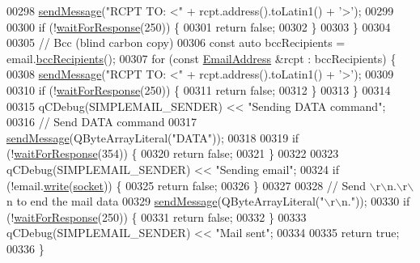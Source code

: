 \begin{DoxyCode}
00298         \hyperlink{class_simple_mail_1_1_sender_private_a01805bb24291bf6cad3a656a16d0bb25}{sendMessage}(\textcolor{stringliteral}{"RCPT TO: <"} + rcpt.address().toLatin1() + \textcolor{charliteral}{'>'});
00299 
00300         \textcolor{keywordflow}{if} (!\hyperlink{class_simple_mail_1_1_sender_private_af8ba23dc3e1201d303ad1d923235c71c}{waitForResponse}(250)) \{
00301             \textcolor{keywordflow}{return} \textcolor{keyword}{false};
00302         \}
00303     \}
00304 
00305     \textcolor{comment}{// Bcc (blind carbon copy)}
00306     \textcolor{keyword}{const} \textcolor{keyword}{auto} bccRecipients = email.\hyperlink{class_simple_mail_1_1_mime_message_a160a1f92f2dd26e2154514fa51303db5}{bccRecipients}();
00307     \textcolor{keywordflow}{for} (\textcolor{keyword}{const} \hyperlink{class_simple_mail_1_1_email_address}{EmailAddress} &rcpt : bccRecipients) \{
00308         \hyperlink{class_simple_mail_1_1_sender_private_a01805bb24291bf6cad3a656a16d0bb25}{sendMessage}(\textcolor{stringliteral}{"RCPT TO: <"} + rcpt.address().toLatin1() + \textcolor{charliteral}{'>'});
00309 
00310         \textcolor{keywordflow}{if} (!\hyperlink{class_simple_mail_1_1_sender_private_af8ba23dc3e1201d303ad1d923235c71c}{waitForResponse}(250)) \{
00311             \textcolor{keywordflow}{return} \textcolor{keyword}{false};
00312         \}
00313     \}
00314 
00315     qCDebug(SIMPLEMAIL\_SENDER) << \textcolor{stringliteral}{"Sending DATA command"};
00316     \textcolor{comment}{// Send DATA command}
00317     \hyperlink{class_simple_mail_1_1_sender_private_a01805bb24291bf6cad3a656a16d0bb25}{sendMessage}(QByteArrayLiteral(\textcolor{stringliteral}{"DATA"}));
00318 
00319     \textcolor{keywordflow}{if} (!\hyperlink{class_simple_mail_1_1_sender_private_af8ba23dc3e1201d303ad1d923235c71c}{waitForResponse}(354)) \{
00320         \textcolor{keywordflow}{return} \textcolor{keyword}{false};
00321     \}
00322 
00323     qCDebug(SIMPLEMAIL\_SENDER) << \textcolor{stringliteral}{"Sending email"};
00324     \textcolor{keywordflow}{if} (!email.\hyperlink{class_simple_mail_1_1_mime_message_ae7fff977d1c558ddc6711416fe0ff723}{write}(\hyperlink{class_simple_mail_1_1_sender_private_a223cab47555a39f45f30569328fa20bc}{socket})) \{
00325         \textcolor{keywordflow}{return} \textcolor{keyword}{false};
00326     \}
00327 
00328     \textcolor{comment}{// Send \(\backslash\)r\(\backslash\)n.\(\backslash\)r\(\backslash\)n to end the mail data}
00329     \hyperlink{class_simple_mail_1_1_sender_private_a01805bb24291bf6cad3a656a16d0bb25}{sendMessage}(QByteArrayLiteral(\textcolor{stringliteral}{"\(\backslash\)r\(\backslash\)n."}));
00330     \textcolor{keywordflow}{if} (!\hyperlink{class_simple_mail_1_1_sender_private_af8ba23dc3e1201d303ad1d923235c71c}{waitForResponse}(250)) \{
00331         \textcolor{keywordflow}{return} \textcolor{keyword}{false};
00332     \}
00333     qCDebug(SIMPLEMAIL\_SENDER) << \textcolor{stringliteral}{"Mail sent"};
00334 
00335     \textcolor{keywordflow}{return} \textcolor{keyword}{true};
00336 \}
\end{DoxyCode}
